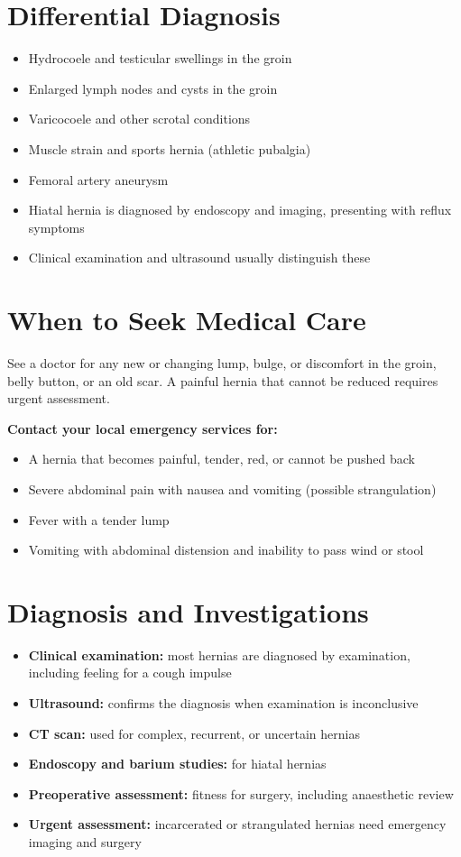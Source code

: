 \section*{Differential Diagnosis}
\begin{itemize}
    \item Hydrocoele and testicular swellings in the groin
    \item Enlarged lymph nodes and cysts in the groin
    \item Varicocoele and other scrotal conditions
    \item Muscle strain and sports hernia (athletic pubalgia)
    \item Femoral artery aneurysm
    \item Hiatal hernia is diagnosed by endoscopy and imaging, presenting with reflux symptoms
    \item Clinical examination and ultrasound usually distinguish these
\end{itemize}

\section*{When to Seek Medical Care}
See a doctor for any new or changing lump, bulge, or discomfort in the groin, belly button, or an old scar. A painful hernia that cannot be reduced requires urgent assessment.

\textbf{Contact your local emergency services for:}
\begin{itemize}
    \item A hernia that becomes painful, tender, red, or cannot be pushed back
    \item Severe abdominal pain with nausea and vomiting (possible strangulation)
    \item Fever with a tender lump
    \item Vomiting with abdominal distension and inability to pass wind or stool
\end{itemize}

\section*{Diagnosis and Investigations}
\begin{itemize}
    \item \textbf{Clinical examination:} most hernias are diagnosed by examination, including feeling for a cough impulse
    \item \textbf{Ultrasound:} confirms the diagnosis when examination is inconclusive
    \item \textbf{CT scan:} used for complex, recurrent, or uncertain hernias
    \item \textbf{Endoscopy and barium studies:} for hiatal hernias
    \item \textbf{Preoperative assessment:} fitness for surgery, including anaesthetic review
    \item \textbf{Urgent assessment:} incarcerated or strangulated hernias need emergency imaging and surgery
\end{itemize}

